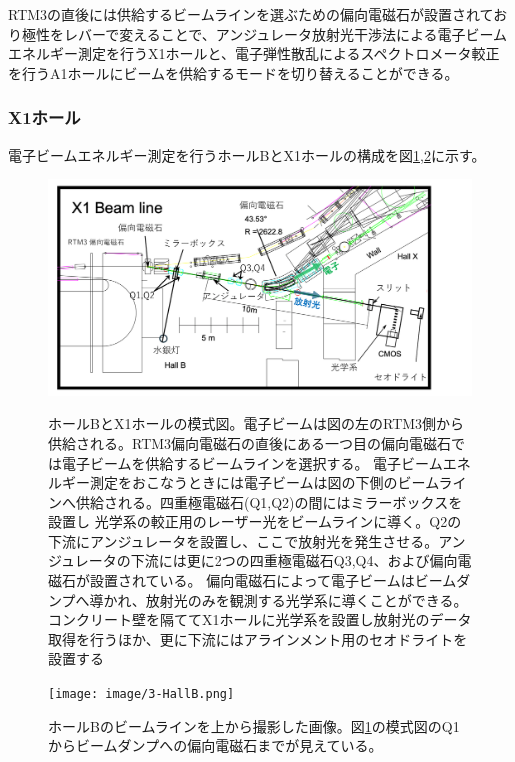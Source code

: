 \documentclass[a4paper,11pt,uplatex]{jsbook}
\begin{document}
RTM3の直後には供給するビームラインを選ぶための偏向電磁石が設置されており極性をレバーで変えることで、アンジュレータ放射光干渉法による電子ビームエネルギー測定を行うX1ホールと、電子弾性散乱によるスペクトロメータ較正を行うA1ホールにビームを供給するモードを切り替えることができる。

\subsubsection{X1ホール}
電子ビームエネルギー測定を行うホールBとX1ホールの構成を図\ref{X1},\ref{X1-2}に示す。
\begin{figure}[h]
  \centering
  \includegraphics[width=\linewidth]{image/3-X1.png}\\
  \caption[ホールBとX1ホールの模式図]{ホールBとX1ホールの模式図。電子ビームは図の左のRTM3側から供給される。RTM3偏向電磁石の直後にある一つ目の偏向電磁石では電子ビームを供給するビームラインを選択する。
  電子ビームエネルギー測定をおこなうときには電子ビームは図の下側のビームラインへ供給される。四重極電磁石(Q1,Q2)の間にはミラーボックスを設置し
  光学系の較正用のレーザー光をビームラインに導く。Q2の下流にアンジュレータを設置し、ここで放射光を発生させる。アンジュレータの下流には更に2つの四重極電磁石Q3,Q4、および偏向電磁石が設置されている。
  偏向電磁石によって電子ビームはビームダンプへ導かれ、放射光のみを観測する光学系に導くことができる。コンクリート壁を隔ててX1ホールに光学系を設置し放射光のデータ取得を行うほか、更に下流にはアラインメント用のセオドライトを設置する}
  \label{X1}
\end{figure}
\begin{figure}[h]
  \centering
  \texttt{[image: image/3-HallB.png]}\\
  \caption[ホールBの写真]{ホールBのビームラインを上から撮影した画像。図\ref{X1}の模式図のQ1からビームダンプへの偏向電磁石までが見えている。}
  \label{X1-2}
\end{figure}
\end{document}
